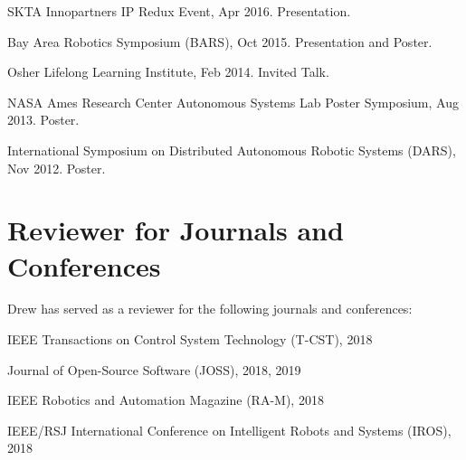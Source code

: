 \documentclass[letterpaper]{deedy-resume} %
\begin{document}
{\begin{etaremune}
\item {} SKTA Innopartners IP Redux Event, Apr 2016. Presentation.

\item {} Bay Area Robotics Symposium (BARS), Oct 2015. Presentation and Poster.
  
\item {\Large{\textasteriskcentered}} {} Osher Lifelong Learning Institute, Feb 2014. Invited Talk.

\item {} NASA Ames Research Center Autonomous Systems Lab Poster Symposium, Aug 2013. Poster.

\item {} International Symposium on Distributed Autonomous Robotic Systems (DARS), Nov 2012. Poster.

\end{etaremune}



\section{Reviewer for Journals and Conferences}

\vspace{0.2cm}

Drew has served as a reviewer for the following journals and conferences:

\vspace{0.2cm}

\begin{tightitemize}

\item IEEE Transactions on Control System Technology (T-CST), 2018

\item Journal of Open-Source Software (JOSS), 2018, 2019
  
\item IEEE Robotics and Automation Magazine (RA-M), 2018

\item IEEE/RSJ International Conference on Intelligent Robots and Systems (IROS), 2018


\end{tightitemize}}
\end{document}
